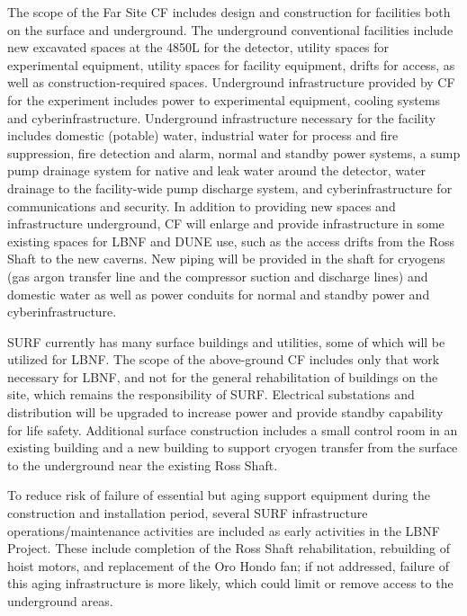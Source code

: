  
The scope of the Far Site CF includes design and construction for facilities both on the surface and underground. The underground conventional facilities include new excavated spaces at the 4850L for the detector, utility spaces for experimental equipment, utility spaces for facility equipment, drifts for access, as well as construction-required spaces. Underground infrastructure provided by CF for the experiment includes power to experimental equipment, cooling systems and cyberinfrastructure. Underground infrastructure necessary for the facility includes domestic (potable) water, industrial water for process and fire suppression, fire detection and alarm, normal and standby power systems, a sump pump drainage system for native and leak water around the detector, water drainage to the facility-wide pump discharge system, and cyberinfrastructure for communications and security.
In addition to providing new spaces and infrastructure underground, CF will enlarge and provide infrastructure in some existing spaces for LBNF and DUNE use, such as the access drifts from the Ross Shaft to the new caverns. New piping will be provided in the shaft for cryogens (gas argon transfer line and the compressor suction and discharge lines) and domestic water as well as power conduits for normal and standby power and cyberinfrastructure. 
 
SURF currently has many surface buildings and utilities, some of which will be utilized for LBNF. The scope of the above-ground CF includes only that work necessary for LBNF, and not for the general rehabilitation of buildings on the site, which remains the responsibility of SURF. 
Electrical substations and distribution will be upgraded to increase power and provide standby capability for life safety. Additional surface construction %
includes a small control room in an existing building and a new building to support cryogen transfer from the surface to the underground near the existing Ross Shaft.
 
To reduce risk of failure of essential but aging support equipment during the construction and installation period, several SURF infrastructure operations/maintenance activities are included as early activities in  the LBNF Project. These include completion of the Ross Shaft rehabilitation, rebuilding of hoist motors, and replacement of the Oro Hondo fan; if not addressed, %
failure of this aging infrastructure is more likely, which could limit or remove access to the underground areas.
 
